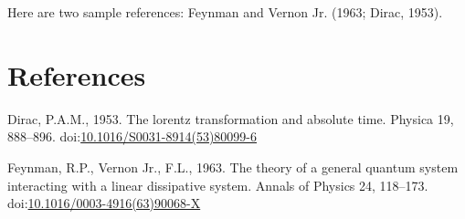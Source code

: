 \documentclass[]{elsarticle} %
\newlength{\cslhangindent}
\newenvironment{cslreferences}%
  {\setlength{\parindent}{0pt}%
  \everypar{\setlength{\hangindent}{\cslhangindent}}\ignorespaces}%
  {\par}
\begin{document}
Here are two sample references: Feynman and Vernon Jr. (1963; Dirac,
1953).

\hypertarget{references}{%
\section*{References}\label{references}}

\hypertarget{refs}{}
\begin{cslreferences}
\leavevmode\hypertarget{ref-Dirac1953888}{}%
Dirac, P.A.M., 1953. The lorentz transformation and absolute time.
Physica 19, 888--896.
doi:\href{https://doi.org/10.1016/S0031-8914(53)80099-6}{10.1016/S0031-8914(53)80099-6}

\leavevmode\hypertarget{ref-Feynman1963118}{}%
Feynman, R.P., Vernon Jr., F.L., 1963. The theory of a general quantum
system interacting with a linear dissipative system. Annals of Physics
24, 118--173.
doi:\href{https://doi.org/10.1016/0003-4916(63)90068-X}{10.1016/0003-4916(63)90068-X}
\end{cslreferences}
\end{document}
